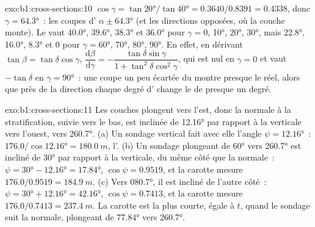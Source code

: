 \begin{solution}{exo:b1:cross-sections:10}
$\cos\gamma = \tan\ang{20}/\tan\ang{40} = 0.3640/0.8391 = 0.4338$, donc
$\gamma = \ang{64.3}$~: les coupes d' $\alpha \pm \ang{64.3}$
(et les directions opposées, où la couche monte). Le  vaut
\ang{40.0}, \ang{39.6}, \ang{38.3} et \ang{36.0} pour $\gamma = 0$, \ang{10},
\ang{20}, \ang{30}, mais \ang{22.8}, \ang{16.0}, \ang{8.3} et $0$ pour
$\gamma = \ang{60}$, \ang{70}, \ang{80}, \ang{90}. En effet, en dérivant
$\tan\beta = \tan\delta\cos\gamma$,
$\dfrac{\mathrm d\beta}{\mathrm d\gamma} =
-\dfrac{\tan\delta\sin\gamma}{1 + \tan^2\delta\cos^2\gamma}$, qui est nul en
$\gamma = 0$ et vaut $-\tan\delta$ en $\gamma = \ang{90}$~: une coupe un peu
écartée du  montre presque le  réel, alors que près de la
direction chaque degré d' change le  de presque un degré.
\end{solution}

\begin{solution}{exo:b1:cross-sections:11}
Les couches plongent vers l'est, donc la normale à la stratification, suivie vers
le bas, est inclinée de \ang{12.16} par rapport à la verticale vers l'ouest, vers
\ang{260.7}. (a) Un sondage vertical fait avec elle l'angle $\psi = \ang{12.16}$~:
$176.0/\cos\ang{12.16} = \qty{180.0}{m}$, l'. (b) Un
sondage plongeant de \ang{60} vers \ang{260.7} est incliné de \ang{30} par
rapport à la verticale, du même côté que la normale~: $\psi = \ang{30} - \ang{12.16} =
\ang{17.84}$, $\cos\psi = 0.9519$, et la carotte mesure $176.0/0.9519 =
\qty{184.9}{m}$. (c) Vers \ang{080.7}, il est incliné de l'autre côté~:
$\psi = \ang{30} + \ang{12.16} = \ang{42.16}$, $\cos\psi = 0.7413$, et la
carotte mesure $176.0/0.7413 = \qty{237.4}{m}$. La carotte est la plus courte,
égale à $t$, quand le sondage suit la normale, plongeant de \ang{77.84} vers
\ang{260.7}.
\end{solution}

